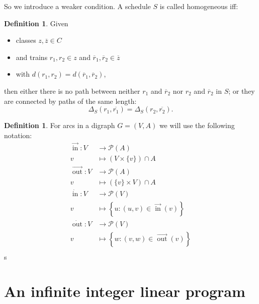 \documentclass[a4paper]{amsart}
\theoremstyle{definition}
\newtheorem{defn}[theorem]{Definition}
\theoremstyle{remark}
\newcommand{\ol}[1]{\overline{#1}}
\DeclareMathOperator{\In}{in}
\DeclareMathOperator{\Out}{out}
\newcommand{\ina}{\ensuremath{\vec{\In}}}
\newcommand{\outa}{\ensuremath{\vec{\Out}}}
\newcommand{\inv}{\ensuremath{\dot{\In}}}
\newcommand{\outv}{\ensuremath{\dot{\Out}}}
\begin{document}
So we introduce a weaker condition.  A schedule \(S\) is called
homogeneous iff:
\begin{defn} Given
  \begin{itemize}
  \item classes \(z, \ol{z} \in C\)
  \item and trains \(r_1, r_2 \in z\) and \(\ol{r}_1,\ol{r}_2 \in \ol{z}\)
  \item with \( d (r_1, r_2) = d(\ol{r}_1, \ol{r}_2) \),
\end{itemize}
  then either there is no path between neither \(r_1\) and
    \(\ol{r}_2\) nor \(r_2\) and \(\ol{r}_2\) in \(S\); or they are connected by paths of the same length:
    \begin{equation}
      \label{homoEq}
      \Delta_S (r_1, \ol{r_1}) = \Delta_S (r_2, \ol{r_2})\textrm{.}
    \end{equation}
\end{defn}

\begin{defn}
For arcs in a digraph \(G=(V,A)\) we will use the following notation:
\begin{align*}
\ina\colon  V &\to \mathcal{P}(A) \\
v &\mapsto \left(V \times \{v\}\right) \cap A\\
\outa\colon  V &\to \mathcal{P}(A) \\
v &\mapsto \left(\{v\} \times V\right) \cap A\\
\inv\colon  V &\to \mathcal{P}(V) \\
v &\mapsto \left\{ u \colon \left(u,v\right) \in \ina(v) \right\}\\
\outv\colon  V &\to \mathcal{P}(V) \\
v &\mapsto \left\{w \colon \left(v,w\right) \in \outa\left(v\right) \right\}\\
\end{align*}s
\end{defn}

\section{An infinite integer linear program}
\label{infIP}
\end{document}
